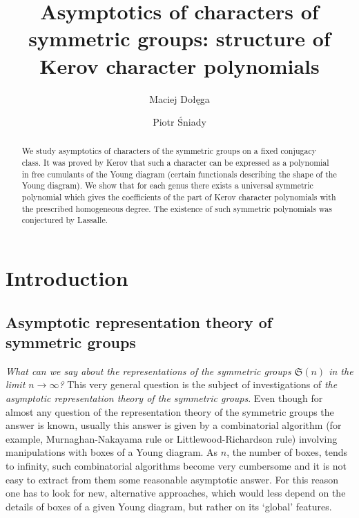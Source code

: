 \documentclass[12pt]{amsart}
\author{Maciej Do\l\k{e}ga}
\author{Piotr \'Sniady}
\title[Structure of Kerov character polynomials]{Asymptotics of characters of
symmetric groups: structure of Kerov character polynomials}
\theoremstyle{plain}
\theoremstyle{remark}
\newcommand{\Sym}{\mathfrak{S}}
\begin{document}
\begin{abstract}
We study asymptotics of characters of the symmetric groups on a fixed conjugacy class.
It was proved by Kerov that such a character can be expressed as a polynomial in free cumulants
of the Young diagram (certain functionals describing the shape of the Young
diagram).
We show that for each genus there exists a universal symmetric
polynomial which gives the coefficients of the part of Kerov character
polynomials with the prescribed homogeneous degree. The existence of such
symmetric polynomials was conjectured by Lassalle.
\end{abstract}


\maketitle



\section{Introduction}
\subsection{Asymptotic representation theory of symmetric groups}
  
\emph{What can we say about the representations of the symmetric groups
$\Sym(n)$ in the limit $n\to\infty$?} This very general question is the subject
of investigations of \emph{the asymptotic representation theory of the symmetric
groups}. Even though for almost any question of the representation theory of the
symmetric groups the answer is known, usually this answer is given by a
combinatorial algorithm (for example, Murnaghan-Nakayama rule or
Littlewood-Richardson rule) involving manipulations with boxes of a Young
diagram. As $n$, the number of boxes, tends to infinity, such combinatorial
algorithms become very cumbersome and it is not easy to extract from them some
reasonable asymptotic answer. For this reason one has to look for new,
alternative approaches, which would less depend on the details of boxes of a
given Young diagram, but rather on its `global' features.
\end{document}
